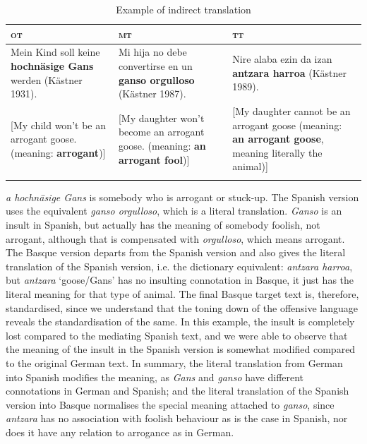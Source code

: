 \documentclass[output=paper]{LSP/langsci}
\begin{document}
\begin{table}
     \centering
     \begin{tabularx}{\textwidth}{XXX}
     \lsptoprule
\textsc{ot} 			& \textsc{mt}     & \textsc{tt}  \\ 
\midrule
Mein Kind soll keine \textbf{hochnäsige Gans} werden (Kästner 1931).   & Mi hija no debe convertirse en un \textbf{ganso orgulloso} (Kästner 1987).   & Nire alaba ezin da izan \textbf{antzara harroa} (Kästner 1989). \\ 
{[}My child won't be an arrogant goose. (meaning: \textbf{arrogant}){]} & {[}My daughter won't become an arrogant goose. (meaning: \textbf{an arrogant fool}){]}  & {[}My daughter cannot be an arrogant goose (meaning: \textbf{an arrogant goose}, meaning literally the animal){]}  \\

\lspbottomrule
\end{tabularx}

 \caption{Example of indirect translation}
     \label{3.3}
\end{table}


\textit{a hochnäsige Gans} is somebody who is arrogant or stuck-up. The Spanish version uses the equivalent \textit{ganso orgulloso}, which is a literal translation. \textit{Ganso} is an insult in Spanish, but actually has the meaning of somebody foolish, not arrogant, although that is compensated with \textit{orgulloso}, which means arrogant. The Basque version departs from the Spanish version and also gives the literal translation of the Spanish version, i.e. the dictionary equivalent: \textit{antzara harroa}, but \textit{antzara} `goose/Gans' has no insulting connotation in Basque, it just has the literal meaning for that type of animal. The final Basque target text is, therefore, standardised, since we understand that the toning down of the offensive language reveals the standardisation of the same. In this example, the insult is completely lost compared to the mediating Spanish text, and we were able to observe that the meaning of the insult in the Spanish version is somewhat modified compared to the original German text. In summary, the literal translation from German into Spanish modifies the meaning, as \textit{Gans} and \textit{ganso} have different connotations in German and Spanish; and the literal translation of the Spanish version into Basque normalises the special meaning attached to \textit{ganso}, since \textit{antzara} has no association with foolish behaviour as is the case in Spanish, nor does it have any relation to arrogance as in German.
\end{document}
